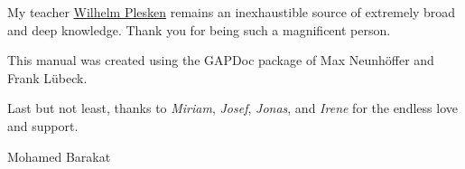 \documentclass[a4paper,11pt]{report}
\newcommand{\logpage}[1]{\protect\write\pagenrlog{#1, \thepage,}}
\begin{document}
{ My teacher \href{http://wwwb.math.rwth-aachen.de/Mitarbeiter/plesken.php} {Wilhelm
  Plesken}  remains an inexhaustible source of extremely broad and deep knowledge. Thank
you for being such a magnificent person. 

 This manual was created using the GAPDoc package of Max Neunh{\"o}ffer and
Frank L{\"u}beck. 

 Last but not least, thanks to \emph{Miriam}, \emph{Josef}, \emph{Jonas}, and \emph{Irene} for the endless love and support. 

 

 Mohamed Barakat \mbox{}}\\[1cm]
\newpage

\def\contentsname{Contents\logpage{[ 0, 0, 3 ]}}

\tableofcontents
\newpage

\end{document}
